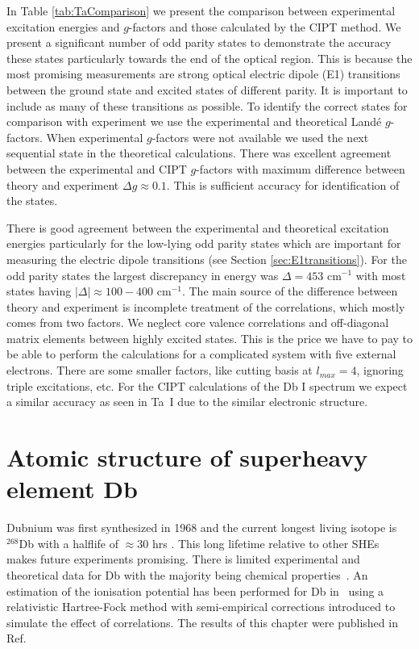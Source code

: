 \documentclass[10pt,a4paper, twoside, openright]{report}
\begin{document}
In Table \ref{tab:TaComparison} we present the comparison between experimental excitation energies and $g$-factors and those calculated by the CIPT method.  We present a significant number of odd parity states to demonstrate the accuracy these states particularly towards the end of the optical region. This is because the most promising measurements are strong optical electric dipole (E1) transitions between the ground state and excited states of different parity. 
It is important to include as many of these transitions as possible. To identify the correct states for comparison with experiment 
we use the experimental and theoretical Land\'{e} $g$-factors. When experimental $g$-factors were not available we used the next sequential state in the theoretical calculations. There was excellent agreement between the experimental and CIPT $g$-factors with maximum difference between theory and experiment $\Delta g \approx 0.1$. This is sufficient accuracy for identification of the states.

There is good agreement between the experimental and theoretical excitation energies particularly for the low-lying odd parity 
states which are important for measuring the electric dipole transitions (see Section \ref{sec:E1transitions}). For the odd parity
states the largest discrepancy in energy was $\Delta = 453$ cm$^{-1}$ with most states having $|\Delta| \approx 100-400$ 
cm$^{-1}$. The main source of the difference between theory and experiment is incomplete treatment of the correlations,
which mostly comes from two factors. We neglect core valence correlations and off-diagonal matrix elements between
highly excited states. This is the price we have to pay to be able to perform the calculations for a
complicated system with five external electrons. There are some smaller factors, like cutting basis at $l_{max}=4$, 
ignoring triple excitations, etc.
For the CIPT calculations of the Db I spectrum we expect a similar accuracy as seen in Ta~I due to the similar electronic structure.\\

\chapter{Atomic structure of superheavy element Db } \label{chap:Db}
Dubnium was first synthesized in 1968 and the current longest living isotope is $^{268}$Db with a halflife of $\approx 30 $ hrs 
\cite{Schadel2012, Oganessian2005}. This long lifetime relative to other SHEs makes future experiments promising. 
There is limited experimental and theoretical data for Db with the majority being chemical properties~\cite{Schadel2012,
 Fricke1975}.  An estimation of the ionisation potential has been performed for Db in~\cite{Dzuba2016} using a relativistic 
 Hartree-Fock  method with semi-empirical corrections introduced to simulate the effect of correlations. The results of this chapter were published in Ref. \cite{LDFDb2018}
\end{document}
